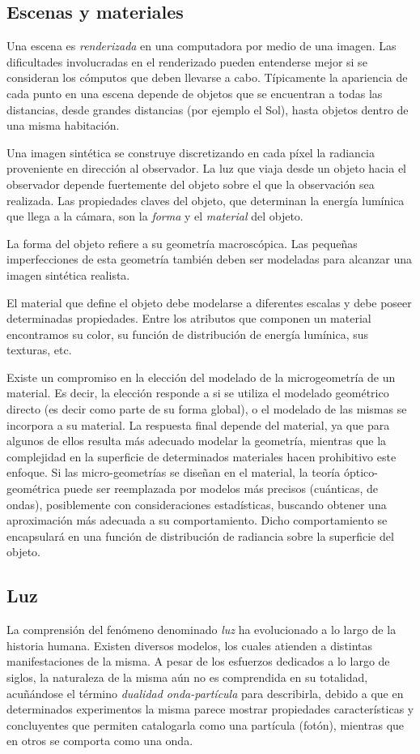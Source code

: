 \subsection{Escenas y materiales}
Una escena es {\em renderizada} en una computadora por medio de una imagen.
Las dificultades involucradas en el renderizado pueden entenderse mejor si se consideran los cómputos que deben llevarse a cabo.
Típicamente la apariencia de cada punto en una escena depende de objetos que se encuentran a todas las distancias, desde grandes distancias (por ejemplo el Sol), hasta objetos dentro de una misma habitación.

Una imagen sintética se construye discretizando en cada píxel la radiancia proveniente en dirección al observador.
La luz que viaja desde un objeto hacia el observador depende fuertemente del objeto sobre el que la observación sea realizada.
Las propiedades claves del objeto, que determinan la energía lumínica que llega a la cámara, son la {\em forma} y el {\em material} del objeto.

La forma del objeto refiere a su geometría macroscópica.
Las pequeñas imperfecciones de esta geometría también deben ser modeladas para alcanzar una imagen sintética realista.

El material que define el objeto debe modelarse a diferentes escalas y debe poseer determinadas propiedades.
Entre los atributos que componen un material encontramos su color, su función de distribución de energía lumínica, sus texturas, etc.

Existe un compromiso en la elección del modelado de la microgeometría de un material.
Es decir, la elección responde a si se utiliza el modelado geométrico directo (es decir como parte de su forma global), o el modelado de las mismas se incorpora a su material.
La respuesta final depende del material, ya que para algunos de ellos resulta más adecuado modelar la geometría, mientras que la complejidad en la superficie de determinados materiales hacen prohibitivo este enfoque.
Si las micro-geometrías se diseñan en el material, la teoría óptico-geométrica puede ser reemplazada por modelos más precisos (cuánticas, de ondas), posiblemente con consideraciones estadísticas, buscando obtener una aproximación más adecuada a su comportamiento.
Dicho comportamiento se encapsulará en una función de distribución de radiancia sobre la superficie del objeto.



\subsection{Luz}%
La comprensión del fenómeno denominado {\em luz} ha evolucionado a lo largo de la historia humana.
Existen diversos modelos, los cuales atienden a distintas manifestaciones de la misma.
A pesar de los esfuerzos dedicados a lo largo de siglos, la naturaleza de la misma aún no es comprendida en su totalidad, acuñándose el término {\em dualidad onda-partícula} para describirla, debido a que en determinados experimentos la misma parece mostrar propiedades características y concluyentes que permiten catalogarla como una partícula (fotón), mientras que en otros se comporta como una onda.

